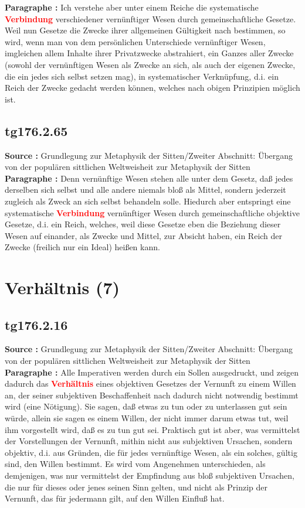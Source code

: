 \documentclass[a4paper,12pt,twoside]{book}
\newcommand{\match}[1]{\textcolor{red}{\textbf{#1}}}
\newcommand{\unnumberedsection}[1]{
	\section*{#1}
	\addcontentsline{toc}{section}{#1}
	\markright{#1}
}
\begin{document}
	\textbf{Paragraphe : }Ich verstehe aber unter einem Reiche die systematische \match{Verbindung} verschiedener vernünftiger Wesen durch gemeinschaftliche Gesetze. Weil nun Gesetze die Zwecke ihrer allgemeinen Gültigkeit nach bestimmen, so wird, wenn man von dem persönlichen Unterschiede vernünftiger Wesen, imgleichen allem Inhalte ihrer Privatzwecke abstrahiert, ein Ganzes aller Zwecke (sowohl der vernünftigen Wesen als Zwecke an sich, als auch der eigenen Zwecke, die ein jedes sich selbst setzen mag), in systematischer Verknüpfung, d.i. ein Reich der Zwecke gedacht werden können, welches nach obigen Prinzipien möglich ist. 
	
	\subsection*{tg176.2.65} 
	\textbf{Source : }Grundlegung zur Metaphysik der Sitten/Zweiter Abschnitt: Übergang von der populären sittlichen Weltweisheit zur Metaphysik der Sitten\\  
	
	\textbf{Paragraphe : }Denn vernünftige Wesen stehen alle unter dem Gesetz, daß jedes derselben sich selbst und alle andere niemals bloß als Mittel, sondern jederzeit zugleich als Zweck an sich selbst behandeln solle. Hiedurch aber entspringt eine systematische \match{Verbindung} vernünftiger Wesen durch gemeinschaftliche objektive Gesetze, d.i. ein Reich, welches, weil diese Gesetze eben die Beziehung dieser Wesen auf einander, als Zwecke und Mittel, zur Absicht haben, ein Reich der Zwecke (freilich nur ein Ideal) heißen kann. 
	
	\unnumberedsection{Verhältnis (7)} 
	\subsection*{tg176.2.16} 
	\textbf{Source : }Grundlegung zur Metaphysik der Sitten/Zweiter Abschnitt: Übergang von der populären sittlichen Weltweisheit zur Metaphysik der Sitten\\  
	
	\textbf{Paragraphe : }
	Alle Imperativen werden durch ein Sollen ausgedruckt, und zeigen dadurch das \match{Verhältnis} eines objektiven Gesetzes der Vernunft zu einem Willen an, der seiner subjektiven Beschaffenheit nach dadurch nicht notwendig bestimmt wird (eine Nötigung). Sie sagen, daß etwas zu tun oder zu unterlassen gut sein würde, allein sie sagen es einem Willen, der nicht immer darum etwas tut, weil ihm vorgestellt wird, daß es zu tun gut sei. Praktisch gut ist aber, was vermittelst der Vorstellungen der Vernunft, mithin nicht aus subjektiven Ursachen, sondern objektiv, d.i. aus Gründen, die für jedes vernünftige Wesen, als ein solches, gültig sind, den Willen bestimmt. Es wird vom Angenehmen unterschieden, als demjenigen, was nur vermittelst der Empfindung aus bloß subjektiven Ursachen, die nur für dieses oder jenes seinen Sinn gelten, und nicht als Prinzip der Vernunft, das für jedermann gilt, auf den Willen Einfluß hat.
	
\end{document}
